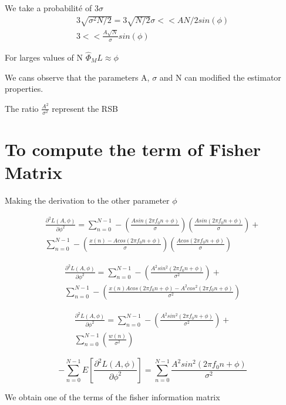 \documentclass{report}
\begin{document}
We take a probabilité of 3$\sigma$
\begin{gather*}\label{key}
3\sqrt{\sigma^2 N/2} = 3\sqrt{N/2}\sigma << AN/2 sin(\phi)\\
3 << \frac{A\sqrt{N}}{\sigma}sin(\phi)
\end{gather*}

For larges values of N $ \hat{\Phi}_ML \approx \phi $

We cans observe that the parameters A, $ \sigma $ and N can modified
the estimator properties.

The ratio $ \frac{A^2}{\sigma^2} $ represent the RSB %



\section{To compute the term of Fisher Matrix}
Making the derivation to the other parameter $ \phi $

\begin{gather*}\label{key}
\frac{\partial^2 L(A,\phi)}{\partial \phi^2} = \sum_{n=0}^{N-1} - 
(\frac{Asin(2\pi f_0 n +\phi)}{\sigma}) (\frac{Asin(2\pi f_0 n 
	+\phi)}{\sigma})+\\
\sum_{n=0}^{N-1} - (\frac{x(n)-Acos(2\pi f_0 n +\phi)}{\sigma}) 
(\frac{Acos(2\pi f_0 n +\phi)}{\sigma})
\end{gather*}


\begin{gather*}\label{key}
\frac{\partial^2 L(A,\phi)}{\partial \phi^2} = \sum_{n=0}^{N-1} - 
(\frac{A^2sin^2(2\pi f_0 n +\phi)}{\sigma^2})+\\
\sum_{n=0}^{N-1} - (\frac{x(n)Acos(2\pi f_0 n +\phi)-A^2cos^2(2\pi f_0 n 
	+\phi)}{\sigma^2})
\end{gather*}


\begin{gather*}\label{key}
\frac{\partial^2 L(A,\phi)}{\partial \phi^2} = \sum_{n=0}^{N-1} - 
(\frac{A^2sin^2(2\pi f_0 n +\phi)}{\sigma^2})+\\
\sum_{n=0}^{N-1} (\frac{w(n)}{\sigma^2})
\end{gather*}

\begin{equation}\label{key}
-\sum_{n=0}^{N-1} E[\frac{\partial^2 L(A,\phi)}{\partial \phi^2}] = 
\sum_{n=0}^{N-1}\frac{A^2sin^2(2\pi f_0 n +\phi)}{\sigma^2}
\end{equation}

We obtain one of the terms of the fisher information matrix
\end{document}
